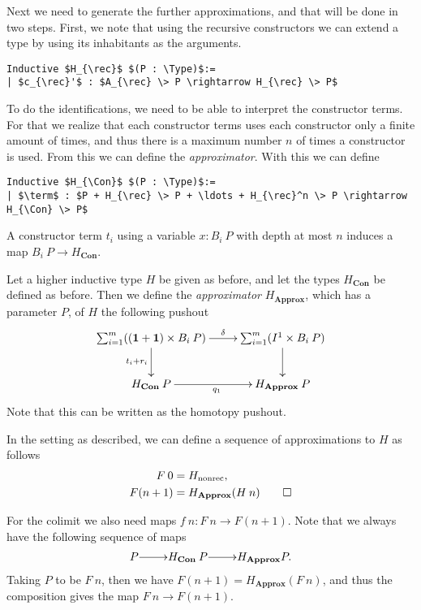 \documentclass[a4paper,UKenglish]{lipics-v2016}
\newcommand{\one}[0]{\textbf{1}}
\newcommand{\rec}[0]{\operatorname{rec}}
\newcommand{\nonrec}[0]{\operatorname{nonrec}}
\newcommand{\term}[0]{\textbf{term}}
\newcommand{\Con}[0]{\textbf{Con}}
\newcommand{\Approx}[0]{\textbf{Approx}}
\newcommand{\Type}[0]{\operatorname{\textsc{Type}}}
\begin{document}
Next we need to generate the further approximations, and that will be done in two steps.
First, we note that using the recursive constructors we can extend a type by using its inhabitants as the arguments.
\lstset{language=Coq}
\begin{lstlisting}
Inductive $H_{\rec}$ $(P : \Type)$:=
| $c_{\rec}'$ : $A_{\rec} \> P \rightarrow H_{\rec} \> P$
\end{lstlisting}
To do the identifications, we need to be able to interpret the constructor terms.
For that we realize that each constructor terms uses each constructor only a finite amount of times, and thus there is a maximum number $n$ of times a constructor is used.
From this we can define the \emph{approximator}.
With this we can define
\lstset{language=Coq}
\begin{lstlisting}
Inductive $H_{\Con}$ $(P : \Type)$:=
| $\term$ : $P + H_{\rec} \> P + \ldots + H_{\rec}^n \> P \rightarrow H_{\Con} \> P$
\end{lstlisting}

\begin{lemma}
A constructor term $t_i$ using a variable $x : B_i \> P$ with depth at most $n$ induces a map $B_i \> P \rightarrow H_{\Con}$.
\end{lemma}

\begin{definition}
Let a higher inductive type $H$ be given as before, and let the types $H_{\Con}$ be defined as before.
Then we define the \emph{approximator} $H_{\Approx}$, which has a parameter $P$, of $H$ the following pushout
\[
\xymatrix
{
	\sum_{i = 1}^m ((\one + \one) \times B_i \> P) \ar[d]_{t_i + r_i} \ar[r]^-\delta & \sum_{i = 1}^m (I^1 \times B_i \> P) \ar[d]\\
	H_{\Con} \> P \ar[r]_{q_1} & H_{\Approx} \> P
}
\]
Note that this can be written as the homotopy pushout.
\end{definition}

\begin{definition}
In the setting as described, we can define a sequence of approximations to $H$ as follows
\begin{align*}
F \> 0 &= H_{\nonrec},\\
F(n+1) &= H_{\Approx}(H \> n) \qedhere
\end{align*}
\end{definition}

For the colimit we also need maps $f \> n : F \> n \rightarrow F(n + 1)$.
Note that we always have the following sequence of maps
\[
\xymatrix@1
{
	P \ar[r] & H_{\Con} \> P \ar[r] & H_{\Approx} P.
}
\]
Taking $P$ to be $F \> n$, then we have $F (n+1) = H_{\Approx} (F \> n)$, and thus the composition gives the map $F \> n \rightarrow F(n + 1)$.
\end{document}
